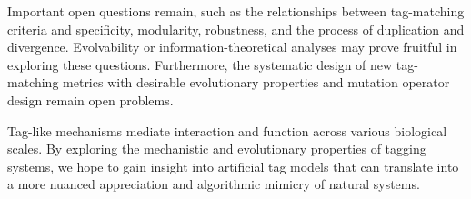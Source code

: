 Important open questions remain, such as the relationships between tag-matching criteria and specificity, modularity, robustness, and the process of duplication and divergence.
Evolvability or information-theoretical analyses may prove fruitful in exploring these questions.
Furthermore, the systematic design of new tag-matching metrics with desirable evolutionary properties and mutation operator design remain open problems.

Tag-like mechanisms mediate interaction and function across various biological scales.
By exploring the mechanistic and evolutionary properties of tagging systems, we hope to gain insight into artificial tag models that can translate into a more nuanced appreciation and algorithmic mimicry of natural systems.
